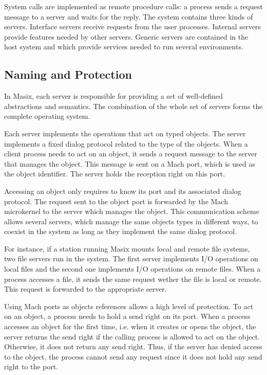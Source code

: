 	System calls are implemented as remote procedure calls: a process
sends a request message to a server and waits for the reply. The system
contains three kinds of servers.
Interface servers receive requests from the user processes.
Internal servers provide features needed by other servers.
Generic servers are contained in the host system and which
provide services needed to run several environments.
	
\subsection {Naming and Protection}

	In Masix, each server is responsible for providing a set of well-defined
abstractions and semantics. The combination of the whole set of servers
forms the complete operating system.

	Each server implements the operations that act on typed objects. The
server implements a fixed dialog protocol related to the
type of the objects. When a client process needs to act on an object, it sends
a request message to the server that manages the object. This message is sent
on a Mach port, which is used as the object identifier. The server holds the
reception right on this port.

	Accessing an object only requires to know its
port and its associated dialog protocol. The request sent to the object
port is forwarded by the Mach microkernel to the server which manages the
object. This communication scheme allows several servers, which manage the
same objects types in different ways, to coexist in the system as long as
they implement the same dialog protocol.

	For instance, if a station running Masix mounts local and remote file
systems, two file servers run in the system. The first server implements I/O
operations on local files and the second one implements I/O operations on
remote files. When a process accesses a file, it sends the same request
wether the
file is local or remote. This request is forwarded to the appropriate
server.

	Using Mach ports as objects references allows a high level of protection.
To act on an object, a process needs to hold a send right on its port.
When a process accesses an object for the first time, i.e. when it creates or
opens the object, the server returns the send right if the calling
process is allowed to act on the object. Otherwise, it does not return
any send right. Thus, if the server has denied access to the object, the
process cannot send any request since it does not hold any send right to the
port.

